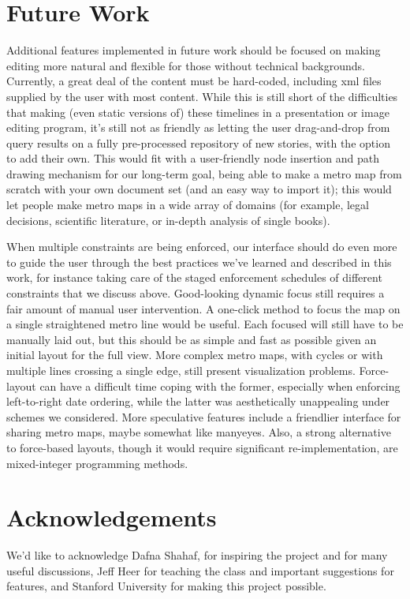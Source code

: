 \documentclass{chi2009}
\begin{document}
\section{Future Work}

Additional features implemented in future work should be focused on making editing more natural and flexible for those without technical backgrounds. Currently, a great deal of the content must be hard-coded, including xml files supplied by the user with most content. While this is still short of the difficulties that making (even static versions of) these timelines in a presentation or image editing program, it's still not as friendly as letting the user drag-and-drop from query results on a fully pre-processed repository of new stories, with the option to add their own. This would fit with a user-friendly node insertion and path drawing mechanism for our long-term goal, being able to make a metro map from scratch with your own document set (and an easy way to import it); this would let people make metro maps in a wide array of domains (for example, legal decisions, scientific literature, or in-depth analysis of single books).

When multiple constraints are being enforced, our interface should do even more to guide the user through the best practices we’ve learned and described in this work, for instance taking care of the staged enforcement schedules of different constraints that we discuss above.
       Good-looking dynamic focus still requires a fair amount of manual user intervention. A one-click method to focus the map on a single straightened metro line would be useful. Each focused will still have to be manually laid out, but this should be as simple and fast as possible given an initial layout for the full view.
       More complex metro maps, with cycles or with multiple lines crossing a single edge, still present visualization problems. Force-layout can have a difficult time coping with the former, especially when enforcing left-to-right date ordering, while the latter was aesthetically unappealing under schemes we considered.
       More speculative features include a friendlier interface for sharing metro maps, maybe somewhat like manyeyes. Also, a strong alternative to force-based layouts, though it would require significant re-implementation, are mixed-integer programming methods.  

\section{Acknowledgements}

We'd like to acknowledge Dafna Shahaf, for inspiring the project and for many useful discussions, Jeff Heer for teaching the class and important suggestions for features, and Stanford University for making this project possible.



\end{document}
